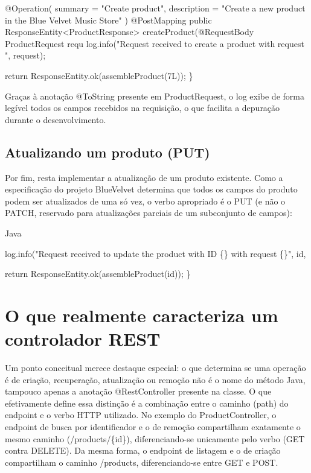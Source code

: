 \begin{codebox}{@Operation(}
summary = "Create product",
description = "Create a new product in the Blue Velvet Music Store"
)
@PostMapping
public ResponseEntity<ProductResponse> createProduct(@RequestBody ProductRequest requ
log.info("Request received to create a product with request {}", request);
\end{codebox}

return ResponseEntity.ok(assembleProduct(7L)); \}

Graças à anotação @ToString presente em ProductRequest, o log exibe de forma legível todos os campos recebidos na requisição, o que facilita a depuração durante o desenvolvimento.

\subsection{Atualizando um produto (PUT)}

Por fim, resta implementar a atualização de um produto existente. Como a especificação do projeto BlueVelvet determina que todos os campos do produto podem ser atualizados de uma só vez, o verbo apropriado é o PUT (e não o PATCH, reservado para atualizações parciais de um subconjunto de campos):

\begin{codebox}{Java}

\end{codebox}

\begin{codebox}{@Operation(}
summary = "Update product",
description = "Update a product from the Blue Velvet Music Store"
)
@PutMapping("/{id}")
public ResponseEntity<ProductResponse> updateProduct(
@PathVariable Long id,
@RequestBody ProductRequest request) {
\end{codebox}

log.info("Request received to update the product with ID \{\} with request \{\}", id,

return ResponseEntity.ok(assembleProduct(id)); \}

\section{O que realmente caracteriza um controlador REST}

Um ponto conceitual merece destaque especial: o que determina se uma operação é de criação, recuperação, atualização ou remoção não é o nome do método Java, tampouco apenas a anotação @RestController presente na classe. O que efetivamente define essa distinção é a combinação entre o caminho (path) do endpoint e o verbo HTTP utilizado. No exemplo do ProductController, o endpoint de busca por identificador e o de remoção compartilham exatamente o mesmo caminho (/products/\{id\}), diferenciando-se unicamente pelo verbo (GET contra DELETE). Da mesma forma, o endpoint de listagem e o de criação compartilham o caminho /products, diferenciando-se entre GET e POST.

